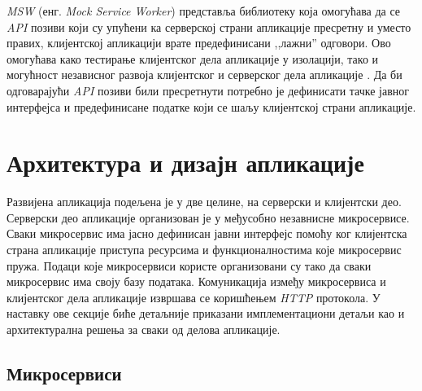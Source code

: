 \documentclass[12pt,oneside]{memoir}
\begin{document}
\textit{MSW} (енг. \textit{Mock Service Worker}) представља библиотеку која омогућава да се \textit{API} позиви који су упућени ка серверској страни апликације пресретну и уместо правих, клијентској апликацији врате предефинисани ,,лажни” одговори. Ово омогућава како тестирање клијентског дела апликације у изолацији, тако и могућност независног развоја клијентског и серверског дела апликације \cite{msw}. Да би одговарајући \textit{API} позиви били пресретнути потребно је дефинисати тачке јавног интерфејса и предефинисане податке који се шаљу клијентској страни апликације.


\section{Архитектура и дизајн апликације}

Развијена апликација подељена је у две целине, на серверски и клијентски део. Серверски део апликације организован је у међусобно незавнисне микросервисе. Сваки микросервис има јасно дефинисан јавни интерфејс помоћу ког клијентска страна апликације приступа ресурсима и функционалностима које микросервис пружа. Подаци које микросервиси користе организовани су тако да сваки микросервис има своју базу података. Комуникација између микросервиса и клијентског дела апликације извршава се коришћењем \textit{HTTP} протокола. У наставку ове секције биће детаљније приказани имплементациони детаљи као и архитектурална решења за сваки од делова апликације.


\subsection{Микросервиси}
\end{document}
